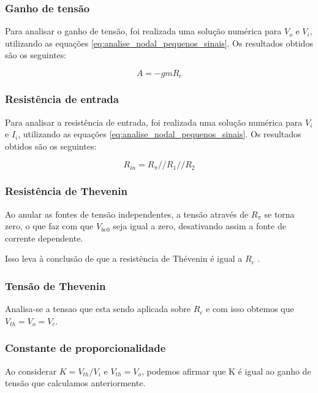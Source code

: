 \subsubsection{Ganho de tensão}

Para analisar o ganho de tensão, foi realizada uma solução numérica para $V_o$ e $V_i$, utilizando as equações \ref*{eq:analise_nodal_pequenos_sinais}. Os resultados obtidos são os seguintes:

\begin{equation}
    A = - gm R_c
\end{equation}

\subsubsection{Resistência de entrada}

Para analisar a resistência de entrada, foi realizada uma solução numérica para $V_i$ e $I_i$, utilizando as equações \ref*{eq:analise_nodal_pequenos_sinais}. Os resultados obtidos são os seguintes:

\begin{equation}
    R_{in} = R_{\pi}  //  R_1  //  R_2
\end{equation}

\subsubsection{Resistência de Thevenin}

Ao anular as fontes de tensão independentes, a tensão através de $R_{\pi}$ se torna zero, o que faz com que $V_{be0}$ seja igual a zero, desativando assim a fonte de corrente dependente.

Isso leva à conclusão de que a resistência de Thévenin é igual a $R_c$
.

\subsubsection{Tensão de Thevenin}

Analisa-se a tensao que esta sendo aplicada sobre $R_c$ e com isso obtemos que $V_{th} = V_o = V_c$.

\subsubsection{Constante de proporcionalidade}

Ao considerar $K = V_{th} / V_i$ e $V_{th} = V_o$, podemos afirmar que K é igual ao ganho de tensão que calculamos anteriormente.

